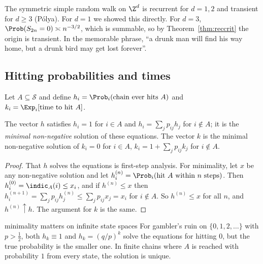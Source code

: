 \begin{example}
The symmetric simple random walk on $\Z^d$ is recurrent for $d=1,2$ and transient for
$d\ge3$ (P\'olya). For $d=1$ we showed this directly. For $d=3$, $\Prob(S_{2n}=0)\asymp
n^{-3/2}$, which is summable, so by Theorem~\ref{thm:reccrit} the origin is transient.
In the memorable phrase, ``a drunk man will find his way home, but a drunk bird may
get lost forever''.
\end{example}

\subsection{Hitting probabilities and times}

Let $A\subseteq\mathcal S$ and define $h_i=\Prob_i(\text{chain ever hits }A)$ and
$k_i=\Exp_i[\text{time to hit }A]$.

\begin{theorem}\label{thm:hitting}
The vector $h$ satisfies $h_i=1$ for $i\in A$ and $h_i=\sum_jp_{ij}h_j$ for $i\notin A$;
it is the \emph{minimal non-negative} solution of these equations. The vector $k$ is
the minimal non-negative solution of $k_i=0$ for $i\in A$, $k_i=1+\sum_jp_{ij}k_j$ for
$i\notin A$.
\end{theorem}
\begin{proof}
That $h$ solves the equations is first-step analysis. For minimality, let $x$ be any
non-negative solution and let $h_i^{(n)}=\Prob_i(\text{hit }A\text{ within }n\text{ steps})$.
Then $h^{(0)}_i=\indic_{A}(i)\le x_i$, and if $h^{(n)}\le x$ then
$h^{(n+1)}_i=\sum_jp_{ij}h^{(n)}_j\le\sum_jp_{ij}x_j=x_i$ for $i\notin A$. So $h^{(n)}\le x$
for all $n$, and $h^{(n)}\uparrow h$. The argument for $k$ is the same.
\end{proof}

\begin{nuance}{minimality matters on infinite state spaces}
For gambler's ruin on $\{0,1,2,\dots\}$ with $p>\tfrac12$, both $h_k\equiv1$ and
$h_k=(q/p)^k$ solve the equations for hitting $0$, but the true probability is the
smaller one. In finite chains where $A$ is reached with probability $1$ from every state,
the solution is unique.
\end{nuance}

